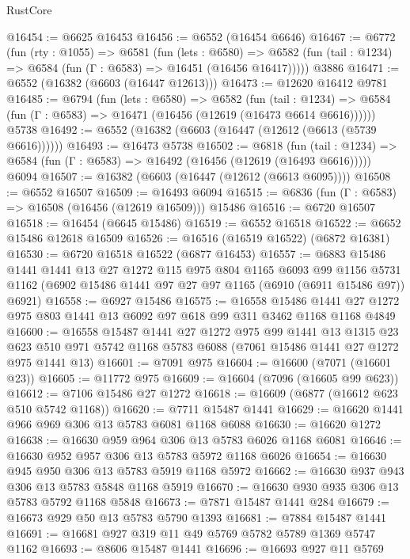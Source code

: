 \begin{lexlean}{RustCore}
\begin{coremodule}
@16454 := @6625 @16453
@16456 := @6552 (@16454 @6646)
@16467 := @6772
    (fun (rty : @1055) =>
    @6581
      (fun (lets : @6580) =>
      @6582 (fun (tail : @1234) => @6584 (fun (Γ : @6583) => @16451 (@16456 @16417)))))
    @3886
@16471 := @6552 (@16382 (@6603 (@16447 @12613)))
@16473 := @12620 @16412 @9781
@16485 := @6794
    (fun (lets : @6580) =>
    @6582
      (fun (tail : @1234) =>
      @6584 (fun (Γ : @6583) => @16471 (@16456 (@12619 (@16473 @6614 @6616))))))
    @5738
@16492 := @6552 (@16382 (@6603 (@16447 (@12612 (@6613 (@5739 @6616))))))
@16493 := @16473 @5738
@16502 := @6818
    (fun (tail : @1234) => @6584 (fun (Γ : @6583) => @16492 (@16456 (@12619 (@16493 @6616)))))
    @6094
@16507 := @16382 (@6603 (@16447 (@12612 (@6613 @6095))))
@16508 := @6552 @16507
@16509 := @16493 @6094
@16515 := @6836 (fun (Γ : @6583) => @16508 (@16456 (@12619 @16509))) @15486
@16516 := @6720 @16507
@16518 := @16454 (@6645 @15486)
@16519 := @6552 @16518
@16522 := @6652 @15486 @12618 @16509
@16526 := @16516 (@16519 @16522) (@6872 @16381)
@16530 := @6720 @16518 @16522 (@6877 @16453)
@16557 := @6883
    @15486
    @1441
    @1441
    @13
    @27
    @1272
    @115
    @975
    @804
    @1165
    @6093
    @99
    @1156
    @5731
    @1162
    (@6902 @15486 @1441 @97 @27 @97 @1165 (@6910 (@6911 @15486 @97)) @6921)
@16558 := @6927 @15486
@16575 := @16558
    @15486
    @1441
    @27
    @1272
    @975
    @803
    @1441
    @13
    @6092
    @97
    @618
    @99
    @311
    @3462
    @1168
    @1168
    @4849
@16600 := @16558
    @15487
    @1441
    @27
    @1272
    @975
    @99
    @1441
    @13
    @1315
    @23
    @623
    @510
    @971
    @5742
    @1168
    @5783
    @6088
    (@7061 @15486 @1441 @27 @1272 @975 @1441 @13)
@16601 := @7091 @975
@16604 := @16600 (@7071 (@16601 @23))
@16605 := @11772 @975
@16609 := @16604 (@7096 (@16605 @99 @623))
@16612 := @7106 @15486 @27 @1272
@16618 := @16609 (@6877 (@16612 @623 @510 @5742 @1168))
@16620 := @7711 @15487 @1441
@16629 := @16620 @1441 @966 @969 @306 @13 @5783 @6081 @1168 @6088
@16630 := @16620 @1272
@16638 := @16630 @959 @964 @306 @13 @5783 @6026 @1168 @6081
@16646 := @16630 @952 @957 @306 @13 @5783 @5972 @1168 @6026
@16654 := @16630 @945 @950 @306 @13 @5783 @5919 @1168 @5972
@16662 := @16630 @937 @943 @306 @13 @5783 @5848 @1168 @5919
@16670 := @16630 @930 @935 @306 @13 @5783 @5792 @1168 @5848
@16673 := @7871 @15487 @1441 @284
@16679 := @16673 @929 @50 @13 @5783 @5790 @1393
@16681 := @7884 @15487 @1441
@16691 := @16681 @927 @319 @11 @49 @5769 @5782 @5789 @1369 @5747 @1162
@16693 := @8606 @15487 @1441
@16696 := @16693 @927 @11 @5769

\end{coremodule}
\end{lexlean}
